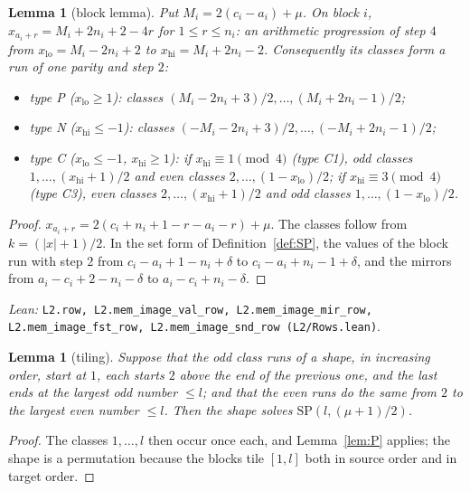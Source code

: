 \documentclass[11pt]{amsart}
\theoremstyle{plain}
\newtheorem{lemma}[theorem]{Lemma}
\theoremstyle{definition}
\theoremstyle{remark}
\newcommand{\SP}{\mathrm{SP}}
\newcommand{\lean}[1]{\par\smallskip
  {\small\raggedright\noindent\textit{Lean:} \texttt{#1}.\par}\smallskip}
\begin{document}
\begin{lemma}[block lemma]\label{lem:block}
Put $M_i = 2(c_i - a_i) + \mu$. On block $i$,
$x_{a_i+r} = M_i + 2n_i + 2 - 4r$ for $1 \le r \le n_i$: an arithmetic progression of
step $4$ from $x_{\mathrm{lo}} = M_i - 2n_i + 2$ to $x_{\mathrm{hi}} = M_i + 2n_i - 2$.
Consequently its classes form a run of one parity and step $2$:
\begin{itemize}
\item type P ($x_{\mathrm{lo}} \ge 1$): classes $(M_i-2n_i+3)/2, \dots, (M_i+2n_i-1)/2$;
\item type N ($x_{\mathrm{hi}} \le -1$): classes $(-M_i-2n_i+3)/2, \dots,
  (-M_i+2n_i-1)/2$;
\item type C ($x_{\mathrm{lo}} \le -1$, $x_{\mathrm{hi}} \ge 1$): if
  $x_{\mathrm{hi}} \equiv 1 \pmod 4$ (type C1), odd classes $1, \dots,
  (x_{\mathrm{hi}}+1)/2$ and even classes $2, \dots, (1-x_{\mathrm{lo}})/2$; if
  $x_{\mathrm{hi}} \equiv 3 \pmod 4$ (type C3), even classes $2, \dots,
  (x_{\mathrm{hi}}+1)/2$ and odd classes $1, \dots, (1-x_{\mathrm{lo}})/2$.
\end{itemize}
\end{lemma}

\begin{proof}
$x_{a_i+r} = 2(c_i+n_i+1-r-a_i-r)+\mu$. The classes follow from $k = (|x|+1)/2$. In the
set form of Definition~\ref{def:SP}, the values of the block run with step $2$ from
$c_i - a_i + 1 - n_i + \delta$ to $c_i - a_i + n_i - 1 + \delta$, and the mirrors from
$a_i - c_i + 2 - n_i - \delta$ to $a_i - c_i + n_i - \delta$.
\end{proof}
\lean{L2.row, L2.mem\_image\_val\_row, L2.mem\_image\_mir\_row, L2.mem\_image\_fst\_row,
L2.mem\_image\_snd\_row (L2/Rows.lean)}

\begin{lemma}[tiling]\label{lem:tiling}
Suppose that the odd class runs of a shape, in increasing order, start at $1$, each
starts $2$ above the end of the previous one, and the last ends at the largest odd number
$\le l$; and that the even runs do the same from $2$ to the largest even number $\le l$.
Then the shape solves $\SP(l,(\mu+1)/2)$.
\end{lemma}

\begin{proof}
The classes $1,\dots,l$ then occur once each, and Lemma~\ref{lem:P} applies; the shape
is a permutation because the blocks tile $[1,l]$ both in source order and in target
order.
\end{proof}
\end{document}
